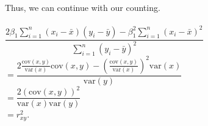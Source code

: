 \documentclass{article}
\begin{document}
\begin{enumerate}
\begin{enumerate}
        Thus, we can continue with our counting.\\\\
        $\dfrac{2\beta_1\sum_{i=1}^{n}(x_i-\bar{x})(y_i-\bar{y})-\beta_1^2\sum_{i=1}^{n}(x_i-\bar{x})^2}{\sum_{i=1}^{n}(y_i-\bar{y})^2}$\\
        $=\dfrac{2\frac{\text{cov}(x,y)}{\text{var}(x)}\text{cov}(x,y)-(\frac{\text{cov}(x,y)}{\text{var}(x)})^2\text{var}(x)}{\text{var}(y)}$\\
        $=\dfrac{2(\text{cov}(x,y))^2}{\text{var}(x)\text{var}(y)}$\\
        $=r_{xy}^2$.
    \end{enumerate}
\end{enumerate}
\end{document}
